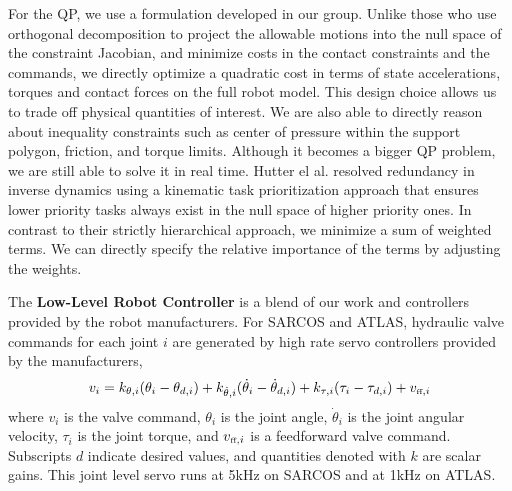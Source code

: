 \documentclass[letterpaper,12pt,fullpage]{article}
\newcommand{\ff}{{\mbox {\tiny ff}}}
\begin{document}
For the QP, we use a formulation developed in our group.
Unlike those
who use orthogonal decomposition to project the allowable motions into the null 
space of the constraint Jacobian, and minimize costs in the contact constraints and the commands, we directly 
optimize a quadratic cost in terms of state accelerations, torques and contact 
forces on the full robot model. This design choice allows us to trade off physical quantities of 
interest. We are also able to directly reason about inequality constraints 
such as center of pressure within the support polygon, friction, and torque 
limits. Although it becomes a bigger QP problem, we are still able to solve it 
in real time. Hutter el al.
resolved redundancy in inverse 
dynamics using a kinematic task prioritization approach that ensures lower 
priority tasks always exist in the null space of higher priority ones. In 
contrast to their strictly hierarchical approach, we minimize a sum of 
weighted terms. 
We can directly specify the relative importance of the terms by adjusting 
the weights. 




The {\bf Low-Level Robot Controller} is a blend of our work and controllers
provided by the robot manufacturers. For SARCOS
and ATLAS, hydraulic valve commands for each
joint $i$ are generated by high rate servo controllers provided
by the manufacturers,
\begin{equation}
v_i = k_{\theta,i} ( \theta_i - \theta_{d,i} )
+ k_{\dot{\theta},i} ( \dot{\theta}_i - \dot{\theta}_{d,i} )
+ k_{\tau,i} ( \tau_i - \tau_{d,i} )
+ v_{\ff,i}
\end{equation}
where $v_i$ is the valve command,
$\theta_i$ is the joint angle,
$\dot{\theta}_i$ is the joint angular velocity,
$\tau_i$ is the joint torque,
and $v_{\ff,i}$ is a feedforward valve command.
Subscripts $d$ indicate desired values, and
quantities denoted with $k$ are scalar gains.
This joint level servo runs at 5kHz on SARCOS and at
1kHz on ATLAS.
\end{document}
